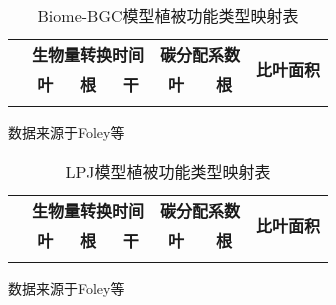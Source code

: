 \begin{table}[!htbp]
    \centering
    \caption{Biome-BGC模型植被功能类型映射表}
    \label{tab:Biome-BGC-PFT-map}
    \begin{threeparttable}
        \begin{tabular}{lcccccc}
            \Xhline{1.5pt} 
            \multirow{2}{*}{\textbf{植被功能类型}} & \multicolumn{3}{c}{\textbf{生物量转换时间}} & \multicolumn{2}{c}{\textbf{碳分配系数}} & \multirow{2}{*}{\textbf{比叶面积}} \\ 
            \cline{2-4} \cline{5-6}
            & \textbf{叶} & \textbf{根} & \textbf{干} & \textbf{叶} & \textbf{根} &  \\ 
            \Xhline{1.5pt}
            \Xhline{1.5pt}
        \end{tabular}
        \begin{tablenotes}
            \footnotesize
            \item[]数据来源于Foley等~\cite{foley1996integrated}
        \end{tablenotes}
    \end{threeparttable}
\end{table}

\begin{table}[!htbp]
    \centering
    \caption{LPJ模型植被功能类型映射表}
    \label{tab:LPJ-PFT-map}
    \begin{threeparttable}
        \begin{tabular}{lcccccc}
            \Xhline{1.5pt} 
            \multirow{2}{*}{\textbf{植被功能类型}} & \multicolumn{3}{c}{\textbf{生物量转换时间}} & \multicolumn{2}{c}{\textbf{碳分配系数}} & \multirow{2}{*}{\textbf{比叶面积}} \\ 
            \cline{2-4} \cline{5-6}
            & \textbf{叶} & \textbf{根} & \textbf{干} & \textbf{叶} & \textbf{根} &  \\ 
            \Xhline{1.5pt}
            \Xhline{1.5pt}
        \end{tabular}
        \begin{tablenotes}
            \footnotesize
            \item[]数据来源于Foley等~\cite{foley1996integrated}
        \end{tablenotes}
    \end{threeparttable}
\end{table}

